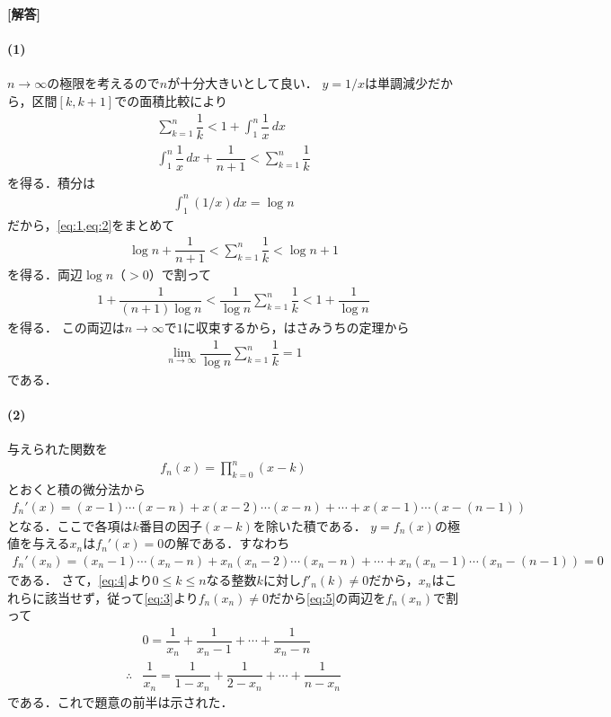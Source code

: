 \documentclass[../../main.tex]{subfiles}
\begin{document}
\begin{oframed}
  
\end{oframed}

{\bf [解答]}

\paragraph{(1)}

$n\to\infty$の極限を考えるので$n$が十分大きいとして良い．
$y=1/x$は単調減少だから，区間$[k,k+1]$での面積比較により
\begin{align}
  \sum_{k=1}^n\dfrac{1}{k}<1+\int_1^n\dfrac{1}{x}\,dx\label{eq:1} \\
  \int_1^n\dfrac{1}{x}\,dx+\dfrac{1}{n+1}<\sum_{k=1}^n\dfrac{1}{k} \label{eq:2}
\end{align}
を得る．積分は
\begin{align}
  \int_1^n(1/x)dx=\log n
\end{align}
だから，\cref{eq:1,eq:2}をまとめて
\begin{align}
  \log n+\dfrac{1}{n+1}<\sum_{k=1}^n\dfrac{1}{k}<\log n+1
\end{align}
を得る．両辺$\log n$（$>0$）で割って
\begin{align}
  1+\dfrac{1}{(n+1)\log n}<\dfrac{1}{\log n}\sum_{k=1}^n\dfrac{1}{k}<1+\dfrac{1}{\log n}
\end{align}
を得る．
この両辺は$n\to\infty$で$1$に収束するから，はさみうちの定理から
\begin{align}
  \lim_{n\to\infty}\dfrac{1}{\log n}\sum_{k=1}^n\dfrac{1}{k}=1
\end{align}
である．

\paragraph{(2)}

与えられた関数を
\begin{align}
  f_n(x)=\displaystyle\prod_{k=0}^n(x-k) \label{eq:3}
\end{align}
とおくと積の微分法から
\begin{align}
  f_n'(x)=(x-1)\cdots(x-n)+x(x-2)\cdots(x-n)+\cdots+x(x-1)\cdots(x-(n-1)) \label{eq:4}
\end{align}
となる．ここで各項は$k$番目の因子$(x-k)$を除いた積である．
$y=f_n(x)$の極値を与える$x_n$は$f_n'(x)=0$の解である．すなわち
\begin{align}
  f_n'(x_n)=(x_n-1)\cdots(x_n-n)+x_n(x_n-2)\cdots(x_n-n)+\cdots+x_n(x_n-1)\cdots(x_n-(n-1)) = 0 \label{eq:5}
\end{align}
である．
さて，\cref{eq:4}より$0\le k\le n$なる整数$k$に対し$f'_n(k)\ne 0$だから，$x_n$はこれらに該当せず，従って\cref{eq:3}より$f_n(x_n)\neq 0$だから\cref{eq:5}の両辺を$f_n(x_n)$で割って
\begin{align}
  &0=\dfrac{1}{x_n}+\dfrac{1}{x_n-1}+\cdots+\dfrac{1}{x_n-n} \\
  \therefore
  &\dfrac{1}{x_n}=\dfrac{1}{1-x_n}+\dfrac{1}{2-x_n}+\cdots+\dfrac{1}{n-x_n} \label{eq:6}
\end{align}
である．これで題意の前半は示された．
\end{document}
